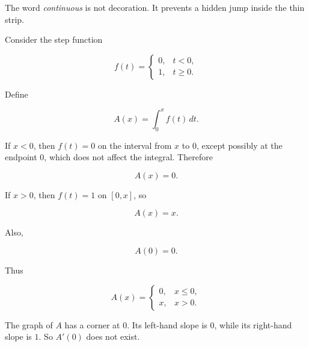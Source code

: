 The word \emph{continuous} is not decoration.  It prevents a hidden jump inside the
thin strip.

Consider the step function

\[
f(t)=
\begin{cases}
0, & t<0,\\
1, & t\ge 0.
\end{cases}
\]

Define

\[
A(x)=\int_0^x f(t)\,dt.
\]

If \(x<0\), then \(f(t)=0\) on the interval from \(x\) to \(0\), except possibly at the
endpoint \(0\), which does not affect the integral.  Therefore

\[
A(x)=0.
\]

If \(x>0\), then \(f(t)=1\) on \([0,x]\), so

\[
A(x)=x.
\]

Also,

\[
A(0)=0.
\]

Thus

\[
A(x)=
\begin{cases}
0, & x\le 0,\\
x, & x>0.
\end{cases}
\]

The graph of \(A\) has a corner at \(0\).  Its left-hand slope is \(0\), while its right-hand
slope is \(1\).  So \(A'(0)\) does not exist.

